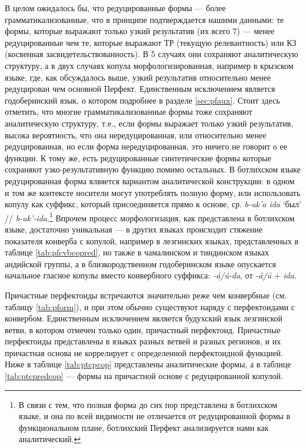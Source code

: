 \par В целом ожидалось бы, что редуцированные формы --- более грамматикализованные, что в принципе подтверждается нашими данными: те формы, которые выражают только узкий результатив (их всего 7) --- менее редуцированные чем те, которые выражают ТР (текущую релевантность) или КЗ (косвенная засвидетельствованность). В 5 случаях они сохраняют аналитическую структуру, а в двух случаях копула морфологизированная, например в крызском языке, где, как обсуждалось выше, узкий результатив относительно менее редуцирован чем основной Перфект. Единственным исключением является годоберинский язык, о котором подробнее в разделе \ref{sec:pfaux}. Стоит здесь отметить, что многие грамматикализованные формы тоже сохраняют аналитическую структуру, т.е., если формы выражает только узкий результатив, высока вероятность, что она нередуцированная, или относительно менее редуцированная, но если форма нередуцированная, это ничего не говорит о ее функции. К тому же, есть редуцированные синтетические формы которые сохраняют узко-результативную функцию помимо остальных. В ботлихском языке редуцированная форма ялвяется вариантом аналитической конструкции: в одном и том же контексте носители могут употреблять полную форму, или использовать копулу как суффикс, который присоединяется прямо к основе, ср. \textit{b-uk'a ida} `был' // \textit{b-uk'-ida}.\footnote{В связи с тем, что полная форма до сих пор представлена в ботлихском языке, и она по всей видимости не отличается от редуцированной формы в функциональном плане, ботлихский Перфект анализируется нами как аналитический.} Впрочем процесс морфологизация, как представлена в ботлихском языке, достаточно уникальная --- в других языках происходит стяжение показателя конверба с копулой, например в лезгинских языках, представленных в таблице \ref{tab:pfcvbcopred}, но также в чамалинском и тиндинском языках андийской группы, а в близкородственном годоберинском языке опускается начальное гласное копулы вместо конвербного суффикса: \textit{-á/ú-da}, от \textit{-á/ú} + \textit{ida}.
\par Причастные перфектоиды встречаются значительно реже чем конвербные (см. таблицу \ref{tab:pform}), и при этом обычно существуют наряду с перфектоидами с конвербом. Единственным исключением является будухский язык лезгинской ветви, в котором отмечен только один, причастный перфектоид. Причастные перфектоиды представлены в языках разных ветвей и разных регионов, и их причастная основа не коррелирует с определенной перфектоидной функцией. Ниже в таблице \ref{tab:ptcpcop} представлены аналитические формы, а в таблице \ref{tab:ptcpredcop} --- формы на причастной основе с редуцированной копулой.

